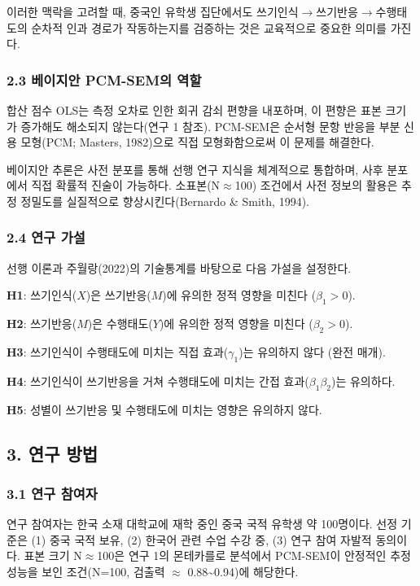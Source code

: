 \documentclass[a4paper,10pt]{oblivoir}
\begin{document}
이러한 맥락을 고려할 때, 중국인 유학생 집단에서도 쓰기인식\ensuremath{\rightarrow}쓰기반응\ensuremath{\rightarrow}수행태도의 순차적 인과 경로가 작동하는지를 검증하는 것은 교육적으로 중요한 의미를 가진다.

\subsubsection{2.3 베이지안 PCM-SEM의 역할}

합산 점수 OLS는 측정 오차로 인한 회귀 감쇠 편향을 내포하며, 이 편향은 표본 크기가 증가해도 해소되지 않는다(연구 1 참조). PCM-SEM은 순서형 문항 반응을 부분 신용 모형(PCM; Masters, 1982)으로 직접 모형화함으로써 이 문제를 해결한다.

베이지안 추론은 사전 분포를 통해 선행 연구 지식을 체계적으로 통합하며, 사후 분포에서 직접 확률적 진술이 가능하다. 소표본(N\ensuremath{\approx}100) 조건에서 사전 정보의 활용은 추정 정밀도를 실질적으로 향상시킨다(Bernardo \& Smith, 1994).

\subsubsection{2.4 연구 가설}

선행 이론과 주월랑(2022)의 기술통계를 바탕으로 다음 가설을 설정한다.

\textbf{H1}: 쓰기인식($X$)은 쓰기반응($M$)에 유의한 정적 영향을 미친다 ($\beta_1 > 0$).

\textbf{H2}: 쓰기반응($M$)은 수행태도($Y$)에 유의한 정적 영향을 미친다 ($\beta_2 > 0$).

\textbf{H3}: 쓰기인식이 수행태도에 미치는 직접 효과($\gamma_1$)는 유의하지 않다 (완전 매개).

\textbf{H4}: 쓰기인식이 쓰기반응을 거쳐 수행태도에 미치는 간접 효과($\beta_1\beta_2$)는 유의하다.

\textbf{H5}: 성별이 쓰기반응 및 수행태도에 미치는 영향은 유의하지 않다.


\subsection{3. 연구 방법}

\subsubsection{3.1 연구 참여자}

연구 참여자는 한국 소재 대학교에 재학 중인 중국 국적 유학생 약 100명이다. 선정 기준은 (1) 중국 국적 보유, (2) 한국어 관련 수업 수강 중, (3) 연구 참여 자발적 동의이다. 표본 크기 N\ensuremath{\approx}100은 연구 1의 몬테카를로 분석에서 PCM-SEM이 안정적인 추정 성능을 보인 조건(N=100, 검출력 \ensuremath{\approx} 0.88\~{}0.94)에 해당한다.
\end{document}
